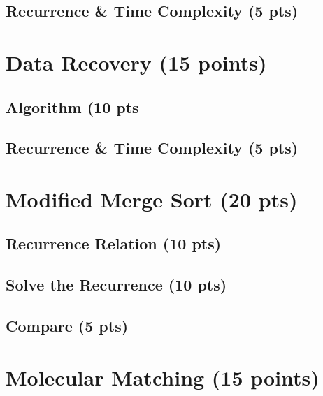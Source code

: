\documentclass{article}[12pt]
\begin{document}
\vspace*{10px}
\subsection{Recurrence \& Time Complexity (5 pts)}

\newpage
\section{Data Recovery (15 points)}
\subsection{Algorithm (10 pts}

\vspace*{10px}
\subsection{Recurrence \& Time Complexity (5 pts)}

\newpage
\section{Modified Merge Sort (20 pts)}

\vspace*{10px}
\subsection{Recurrence Relation (10 pts)}

\vspace*{10px}
\subsection{Solve the Recurrence (10 pts)}

\vspace*{10px}
\subsection{Compare (5 pts)}

\newpage
\section{Molecular Matching (15 points)}
\end{document}

